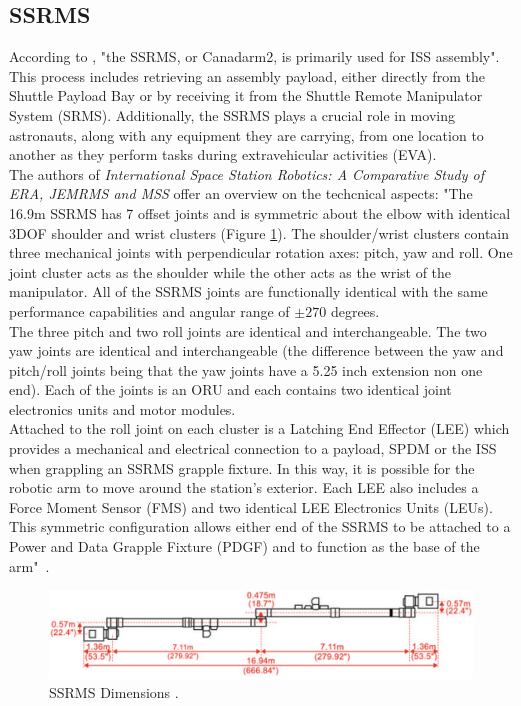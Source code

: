 \documentclass[a4paper,12pt,oneside]{report}
\begin{document}
\subsection{SSRMS}
According to \cite{four}, "the SSRMS, or Canadarm2, is primarily used for ISS assembly". This process includes retrieving an assembly payload, either directly from the Shuttle Payload Bay or by receiving it from the Shuttle Remote Manipulator System (SRMS). Additionally, the SSRMS plays a crucial role in moving astronauts, along with any equipment they are carrying, from one location to another as they perform tasks during extravehicular activities (EVA).\\
The authors of \textit{International Space Station Robotics: A Comparative Study of ERA, JEMRMS and MSS} offer an overview on the techcnical aspects: "The 16.9m SSRMS has 7 offset joints and is symmetric about the elbow with identical 3DOF shoulder and wrist clusters (Figure \ref{SSRMS_dim}). The shoulder/wrist clusters contain three mechanical joints with perpendicular rotation axes: pitch, yaw and roll. One joint cluster acts as the shoulder while the other acts as the wrist of the manipulator. All of the SSRMS joints are functionally identical with the same performance capabilities and angular range of $\pm 270$ degrees. \\
The three pitch and two roll joints are identical and interchangeable. The two yaw joints are identical and interchangeable (the difference between the yaw and pitch/roll joints being that the yaw joints have a 5.25 inch extension non one end). Each of the joints is an ORU and each contains two identical joint electronics units and motor modules.\\
Attached to the roll joint on each cluster is a Latching End Effector (LEE) which provides a mechanical and electrical connection to a payload, SPDM or the ISS when grappling an SSRMS grapple fixture. In this way, it is possible for the robotic arm to move around the station's exterior. Each LEE also includes a Force Moment Sensor (FMS) and two identical LEE Electronics Units (LEUs). This symmetric configuration allows either end of the SSRMS to be attached to a Power and Data Grapple Fixture (PDGF) and to function as the base of the arm"~\cite{four}.\\
\begin{figure}[h]
  \centering
  \includegraphics[scale=0.3]{SSRMS_dimensions.png}
  \caption{SSRMS Dimensions \cite{four}.}
  \label{SSRMS_dim}
\end{figure}
\end{document}
